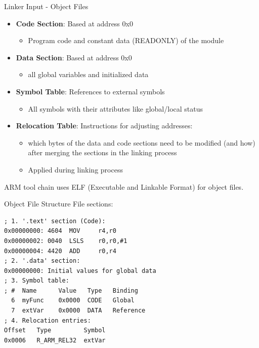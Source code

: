 \begin{definition}{Linker Input - Object Files}
\begin{itemize}
  \item \textbf{Code Section}: Based at address 0x0
    \begin{itemize}
      \item Program code and constant data (READONLY) of the module
    \end{itemize}
  \item \textbf{Data Section}: Based at address 0x0
    \begin{itemize}
      \item all global variables and initialized data
    \end{itemize}
  \item \textbf{Symbol Table}: References to external symbols
    \begin{itemize}
      \item All symbols with their attributes like global/local status
    \end{itemize}
  \item \textbf{Relocation Table}: Instructions for adjusting addresses:
    \begin{itemize}
      \item which bytes of the data and code sections need to be modified (and how) after merging the sections in the linking process
      \item Applied during linking process
    \end{itemize}
\end{itemize}
ARM tool chain uses ELF (Executable and Linkable Format) for object files.
\end{definition}

\begin{example2}{Object File Structure}
  File sections:
\begin{lstlisting}[language=armasm, style=basesmol]
; 1. '.text' section (Code):
0x00000000: 4604  MOV     r4,r0
0x00000002: 0040  LSLS    r0,r0,#1
0x00000004: 4420  ADD     r0,r4
; 2. '.data' section:
0x00000000: Initial values for global data
; 3. Symbol table:
; #  Name      Value   Type   Binding
  6  myFunc    0x0000  CODE   Global
  7  extVar    0x0000  DATA   Reference
; 4. Relocation entries:
Offset   Type         Symbol
0x0006   R_ARM_REL32  extVar
\end{lstlisting}
\end{example2}

